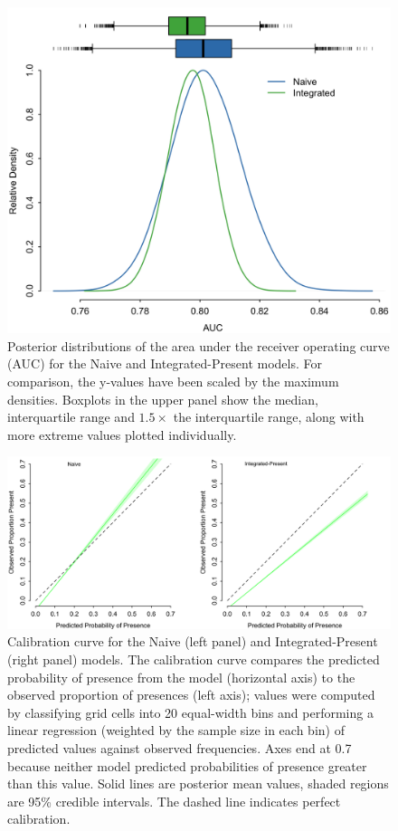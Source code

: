 \documentclass[11pt]{article}
\begin{document}
\begin{figure} 
\includegraphics[width=5.5in]{figs/ex2_auc.png}
\caption{Posterior distributions of the area under the receiver operating curve (AUC) for the Naive and Integrated-Present models. 
For comparison, the y-values have been scaled by the maximum densities. Boxplots in the upper panel show the median, interquartile range and \(1.5 \times\) the interquartile range, along with more extreme values plotted individually.}
\label{fig:auc}
\end{figure}

\begin{figure}
\includegraphics[width=6.5in]{figs/ex2_calib.png}
\caption{Calibration curve for the Naive (left panel) and Integrated-Present (right panel) models.
The calibration curve compares the predicted probability of presence from the model (horizontal axis) to the observed proportion of presences (left axis); values were computed by classifying grid cells into 20 equal-width bins and performing a linear regression (weighted by the sample size in each bin) of predicted values against observed frequencies.
Axes end at 0.7 because neither model predicted probabilities of presence greater than this value.
Solid lines are posterior mean values, shaded regions are 95\% credible intervals.
The dashed line indicates perfect calibration.}
\label{fig:calib}
\end{figure}
\end{document}
